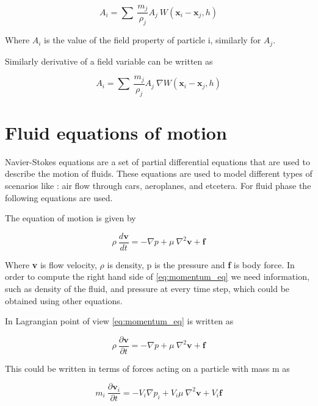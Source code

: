 \begin{equation}
  \label{eq:discrete_form}
  A_i = \sum\> \frac{m_j}{\rho_j} A_j\> W(\boldsymbol{x}_i - \boldsymbol{x}_j, h)
\end{equation}

Where $A_i$ is the value of the field property of particle i,
similarly for $A_j$.

Similarly derivative of a field variable can be written as

\begin{equation}
  \label{eq:discrete_derivative}
  A_i = \sum\> \frac{m_j}{\rho_j} A_j\> \nabla W(\boldsymbol{x}_i - \boldsymbol{x}_j, h)
\end{equation}


\section{Fluid equations of motion}

Navier-Stokes equations are a set of partial differential equations
that are used to describe the motion of fluids. These equations are
used to model different types of scenarios like : air flow through
cars, aeroplanes, and etcetera.  For fluid phase the following
equations are used.

The equation of motion is given by


\begin{equation}
  \label{eq:momentum_eq}
  \rho \>\frac{d\textbf{v}}{dt} = - \nabla p + \mu\> \nabla^2\textbf{v} + \textbf{f}
\end{equation}

Where \textbf{v} is flow velocity, $\rho$ is density, p is the
pressure and \textbf{f} is body force. In order to compute the right
hand side of \eqref{eq:momentum_eq} we need information, such as
density of the fluid, and pressure at every time step, which could be
obtained using other equations.


In Lagrangian point of view  \eqref{eq:momentum_eq} is written as

\begin{equation}
  \label{eq:momentum_eq}
  \rho \>\frac{\partial\textbf{v}}{\partial t} = - \nabla p + \mu\> \nabla^2\textbf{v} + \textbf{f}
\end{equation}

This could be written in terms of forces acting on a particle with mass m as

\begin{equation*}
  \label{eq:forces_eq}
  m_i \>\frac{\partial\textbf{v}_i}{\partial t} = -V_i \nabla p_i + V_i \mu\> \nabla^2\textbf{v} + V_i \textbf{f}
\end{equation*}

